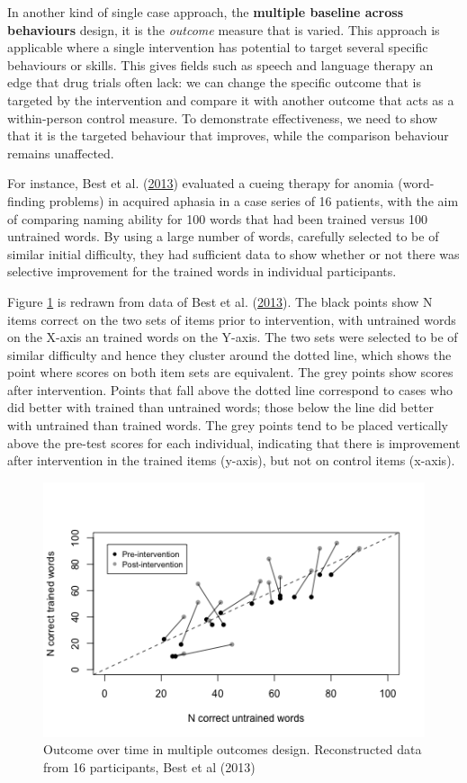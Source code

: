 \documentclass{krantz}
\begin{document}
In another kind of single case approach, the \textbf{multiple baseline across behaviours} design, it is the \emph{outcome} measure that is varied. This approach is applicable where a single intervention has potential to target several specific behaviours or skills. This gives fields such as speech and language therapy an edge that drug trials often lack: we can change the specific outcome that is targeted by the intervention and compare it with another outcome that acts as a within-person control measure. To demonstrate effectiveness, we need to show that it is the targeted behaviour that improves, while the comparison behaviour remains unaffected.

For instance, Best et al. (\protect\hyperlink{ref-best2013}{2013}) evaluated a cueing therapy for anomia (word-finding problems) in acquired aphasia in a case series of 16 patients, with the aim of comparing naming ability for 100 words that had been trained versus 100 untrained words. By using a large number of words, carefully selected to be of similar initial difficulty, they had sufficient data to show whether or not there was selective improvement for the trained words in individual participants.

Figure \ref{fig:bestplot} is redrawn from data of Best et al. (\protect\hyperlink{ref-best2013}{2013}). The black points show N items correct on the two sets of items prior to intervention, with untrained words on the X-axis an trained words on the Y-axis. The two sets were selected to be of similar difficulty and hence they cluster around the dotted line, which shows the point where scores on both item sets are equivalent. The grey points show scores after intervention. Points that fall above the dotted line correspond to cases who did better with trained than untrained words; those below the line did better with untrained than trained words. The grey points tend to be placed vertically above the pre-test scores for each individual, indicating that there is improvement after intervention in the trained items (y-axis), but not on control items (x-axis).

\begin{figure}
\includegraphics[width=0.75\linewidth]{images_bw/bestplot} \caption{Outcome over time in multiple outcomes design. Reconstructed data from 16 participants, Best et al (2013)}\label{fig:bestplot}
\end{figure}
\end{document}
